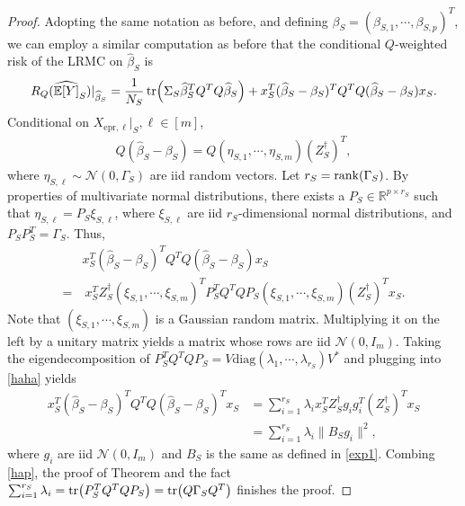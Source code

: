 \documentclass[11pt,a4paper]{amsart}
\numberwithin{equation}{section}
\theoremstyle{plain}
\theoremstyle{definition}
\def\R{{\mathbb R}}
\def\E{{\mathbb E}}
\def\R{{\mathbb R}}
\def\ex{{\text{epr}}}
\begin{document}
\begin{proof}
Adopting the same notation as before, and defining $\beta_S = (\beta_{S,1}, \cdots, \beta_{S,p})^T$, we can employ a similar computation as before that the conditional $Q$-weighted risk of the LRMC on $\widehat{\beta}_S$ is 
\begin{align}
R_Q(\widehat{\E[Y]}_S)|_{\widehat{\beta}_S} = \frac{1}{N_S}\tr(\Sigma_S\widehat{\beta}_S^TQ^TQ\widehat{\beta}_S) + x_S^T(\widehat{\beta}_S-\beta_S)^TQ^TQ(\widehat{\beta}_S-\beta_S)x_S.
\end{align}
Conditional on $X_{\ex,\ell}|_S, \ell\in [m]$,
\begin{align}
Q(\widehat{\beta}_S-\beta_S) = Q(\eta_{S,1}, \cdots, \eta_{S, m})(Z_S^\dagger)^T,
\end{align}
where $\eta_{S,\ell}\sim\mathcal N(0,\Gamma_S)$ are iid random vectors. 
Let $r_S = \rank(\Gamma_S)$.
By properties of multivariate normal distributions, there exists a $P_S\in\R^{p\times r_S}$ such that $\eta_{S,\ell} = P_S\xi_{S, \ell}$, where $\xi_{S,\ell}$ are iid $r_S$-dimensional normal distributions, and $P_SP_S^T = \Gamma_S$. 
Thus, 
\begin{align}
&x_S^T(\widehat{\beta}_S-\beta_S)^TQ^TQ(\widehat{\beta}_S-\beta_S)x_S\nonumber\\
=&\  x_S^TZ_S^\dagger(\xi_{S,1}, \cdots, \xi_{S, m})^TP_S^TQ^TQP_S(\xi_{S,1}, \cdots, \xi_{S, m})(Z_S^\dagger)^Tx_S.\label{haha}
\end{align}
Note that $(\xi_{S,1}, \cdots, \xi_{S, m})$ is a Gaussian random matrix. Multiplying it on the left by a unitary matrix yields a matrix whose rows are iid $\mathcal N(0, I_m)$. 
Taking the eigendecomposition of $P_S^TQ^TQP_S = V\text{diag}(\lambda_1, \cdots, \lambda_{r_S})V^*$ and plugging into \eqref{haha} yields   
\begin{align}
x_S^T(\widehat{\beta}_S-\beta_S)^TQ^TQ(\widehat{\beta}_S-\beta_S)^Tx_S &= \sum_{i=1}^{r_S}\lambda_ix_S^TZ_S^\dagger g_ig_i^T(Z_S^\dagger)^Tx_S\nonumber\\
& = \sum_{i = 1}^{r_S}\lambda_i\|B_Sg_i\|^2,\label{hap}
\end{align}
where $g_i$ are iid $\mathcal N(0, I_m)$ and $B_S$ is the same as defined in \eqref{exp1}. 
Combing \eqref{hap}, the proof of Theorem \label{thm:cons} and the fact $\sum_{i=1}^{r_S}\lambda_i = \tr(P_S^TQ^TQP_S) = \tr(Q\Gamma_SQ^T)$ finishes the proof. 
\end{proof}
\end{document}
